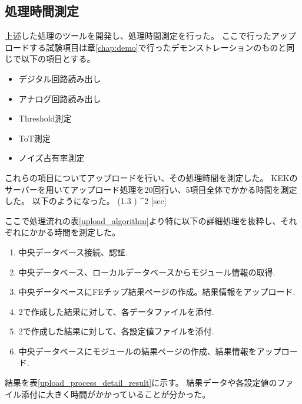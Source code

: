 \subsection{処理時間測定}
上述した処理のツールを開発し、処理時間測定を行った。
ここで行ったアップロードする試験項目は章\ref{chap:demo}で行ったデモンストレーションのものと同じで以下の項目とする。
\begin{itemize}
  \item デジタル回路読み出し
  \item アナログ回路読み出し
  \item Threshold測定
  \item ToT測定
  \item ノイズ占有率測定
\end{itemize}

これらの項目についてアップロードを行い、その処理時間を測定した。
KEKのサーバーを用いてアップロード処理を20回行い、5項目全体でかかる時間を測定した。
以下のようになった。
\bbb
  (1.3 ) ^2 [{\rm sec}]
\eee

ここで処理流れの表\ref{upload_algorithm}より特に以下の詳細処理を抜粋し、それぞれにかかる時間を測定した。

\begin{enumerate}
  \item 中央データベース接続、認証.
  \item 中央データベース、ローカルデータベースからモジュール情報の取得.
  \item 中央データベースにFEチップ結果ページの作成。結果情報をアップロード.
  \item 2で作成した結果に対して、各データファイルを添付.
  \item 2で作成した結果に対して、各設定値ファイルを添付.
  \item 中央データベースにモジュールの結果ページの作成、結果情報をアップロード.
\end{enumerate}

結果を表\ref{upload_process_detail_result}に示す。
結果データや各設定値のファイル添付に大きく時間がかかっていることが分かった。

